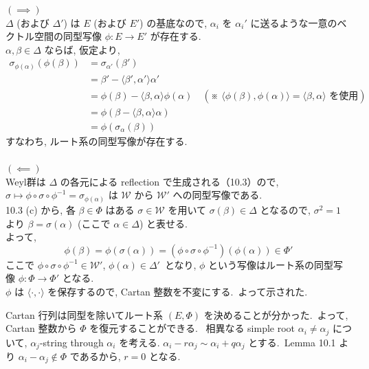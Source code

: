 \documentclass[uplatex,dvipdfmx]{jsarticle}
\begin{document}
\begin{myproof}
    $(\implies)$\\
    $\Delta$ (および $\Delta'$) は $E$ (および $E'$) の基底なので, $\alpha_i$ を $\alpha_i'$ に送るような一意のベクトル空間の同型写像 $\phi: E \to E'$ が存在する.\\
    $\alpha, \beta \in \Delta$ ならば, 仮定より,
    \begin{align*}
        \sigma_{\phi(\alpha)}(\phi(\beta)) &= \sigma_{\alpha'}(\beta') \\
        &= \beta' - \langle \beta', \alpha' \rangle \alpha' \\
        &= \phi(\beta) - \langle \beta, \alpha \rangle \phi(\alpha) \quad (\text{※ } \langle \phi(\beta), \phi(\alpha) \rangle = \langle \beta, \alpha \rangle \text{ を使用}) \\
        &= \phi(\beta - \langle \beta, \alpha \rangle \alpha) \\
        &= \phi(\sigma_\alpha(\beta))
    \end{align*}
    すなわち, ルート系の同型写像が存在する.\\\\
    \noindent $(\impliedby)$\\
    Weyl群は $\Delta$ の各元による reflection で生成される（10.3）ので,
    $\sigma \mapsto \phi \circ \sigma \circ \phi^{-1} = \sigma_{\phi(\alpha)}$ は $\mathcal{W}$ から $\mathcal{W}'$ への同型写像である.\\
    10.3 (c) から, 各 $\beta \in \Phi$ はある $\sigma \in \mathcal{W}$ を用いて $\sigma(\beta) \in \Delta$ となるので, $\sigma^2 = 1$ より $\beta = \sigma(\alpha)$ (ここで $\alpha \in \Delta$) と表せる.\\
    よって,
    \begin{equation*}
        \phi(\beta) = \phi(\sigma(\alpha)) = (\phi \circ \sigma \circ \phi^{-1})(\phi(\alpha)) \in \Phi'
    \end{equation*}
    ここで $\phi \circ \sigma \circ \phi^{-1} \in \mathcal{W}'$, $\phi(\alpha) \in \Delta'$~となり, $\phi$ という写像はルート系の同型写像 $\phi: \Phi \to \Phi'$ となる.\\
    $\phi$ は $\langle \cdot, \cdot \rangle$ を保存するので, Cartan 整数を不変にする.~よって示された.
\end{myproof}
Cartan 行列は同型を除いてルート系 $(E, \Phi)$ を決めることが分かった.~よって, Cartan 整数から $\Phi$ を復元することができる.~
相異なる simple root $\alpha_i \neq \alpha_j$ について, $\alpha_j$-string through $\alpha_i$ を考える.
$\alpha_i - r\alpha_j \sim \alpha_i + q\alpha_j$ とする.~Lemma 10.1 より $\alpha_i - \alpha_j \notin \Phi$ であるから, $r=0$ となる.
\end{document}
